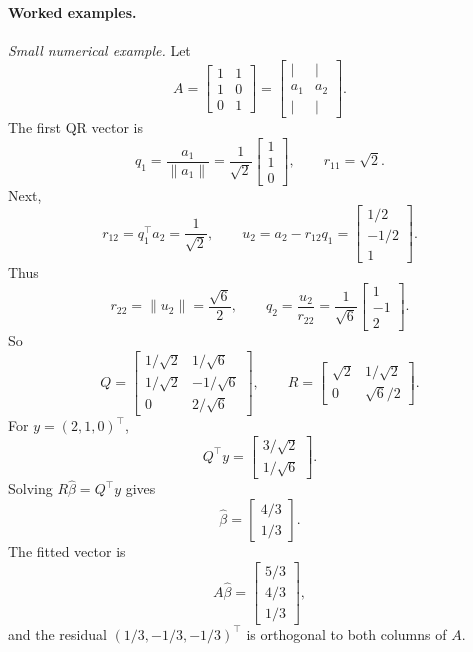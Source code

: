 \paragraph{Worked examples.}
\emph{Small numerical example.} Let
\[
A=
\begin{bmatrix}
1&1\\
1&0\\
0&1
\end{bmatrix}
=
\begin{bmatrix}
|&|\\
a_1&a_2\\
|&|
\end{bmatrix}.
\]
The first QR vector is
\[
q_1=\frac{a_1}{\|a_1\|}
=\frac{1}{\sqrt2}
\begin{bmatrix}
1\\1\\0
\end{bmatrix},
\qquad
r_{11}=\sqrt2.
\]
Next,
\[
r_{12}=q_1^\top a_2=\frac{1}{\sqrt2},
\qquad
u_2=a_2-r_{12}q_1
=
\begin{bmatrix}
1/2\\-1/2\\1
\end{bmatrix}.
\]
Thus
\[
r_{22}=\|u_2\|=\frac{\sqrt6}{2},
\qquad
q_2=\frac{u_2}{r_{22}}
=\frac{1}{\sqrt6}
\begin{bmatrix}
1\\-1\\2
\end{bmatrix}.
\]
So
\[
Q=
\begin{bmatrix}
1/\sqrt2&1/\sqrt6\\
1/\sqrt2&-1/\sqrt6\\
0&2/\sqrt6
\end{bmatrix},
\qquad
R=
\begin{bmatrix}
\sqrt2&1/\sqrt2\\
0&\sqrt6/2
\end{bmatrix}.
\]
For \(y=(2,1,0)^\top\),
\[
Q^\top y=
\begin{bmatrix}
3/\sqrt2\\
1/\sqrt6
\end{bmatrix}.
\]
Solving \(R\hat\beta=Q^\top y\) gives
\[
\hat\beta=
\begin{bmatrix}
4/3\\
1/3
\end{bmatrix}.
\]
The fitted vector is
\[
A\hat\beta=
\begin{bmatrix}
5/3\\4/3\\1/3
\end{bmatrix},
\]
and the residual \((1/3,-1/3,-1/3)^\top\) is orthogonal to both columns of \(A\).

